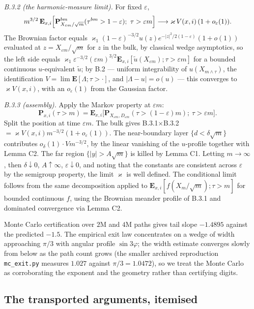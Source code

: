 \documentclass[11pt]{article}
\theoremstyle{definition}
\newcommand{\E}{\mathbf{E}}
\renewcommand{\Pr}{\mathbf{P}}
\begin{document}
\emph{B.3.2 (the harmonic-measure limit).} For fixed $\varepsilon$,
\[
  m^{3/2}\,\E_{x,i}\Bigl[\Pr^{bm}_{X_{\varepsilon m}/\sqrt m}
   (\tau^{bm}>1-\varepsilon);\ \tau>\varepsilon m\Bigr]
  \longrightarrow\varkappa\,V(x,i)\,(1+o_\varepsilon(1)).
\]
The Brownian factor equals
$\varkappa_1(1-\varepsilon)^{-3/2}u(z)e^{-|z|^{2}/2(1-\varepsilon)}(1+o(1))$
evaluated at $z=X_{\varepsilon m}/\sqrt m$ for $z$ in the bulk, by classical
wedge asymptotics, so the left side equals
$\varkappa_1\varepsilon^{-3/2}(\varepsilon m)^{3/2}
\E_{x,i}[\widetilde u(X_{\varepsilon m});\tau>\varepsilon m]$ for a bounded
continuous $u$-equivalent $\widetilde u$; by B.2 --- uniform integrability of
$u(X_{m\wedge\tau})$, the identification $V=\lim\E[\Lambda;\tau>\cdot]$, and
$|\Lambda-u|=o(u)$ --- this converges to $\varkappa V(x,i)$, with an
$o_\varepsilon(1)$ from the Gaussian factor.

\emph{B.3.3 (assembly).} Apply the Markov property at $\varepsilon m$:
\[
  \Pr_{x,i}(\tau>m)=\E_{x,i}\bigl[\Pr_{X_{\varepsilon m},D_{\varepsilon m}}
   (\tau>(1-\varepsilon)m);\ \tau>\varepsilon m\bigr].
\]
Split the position at time $\varepsilon m$. The bulk gives
B.3.1$\times$B.3.2 $=\varkappa V(x,i)m^{-3/2}(1+o_\varepsilon(1))$. The
near-boundary layer $\{d<\delta\sqrt m\}$ contributes
$o_\delta(1)\cdot Vm^{-3/2}$, by the linear vanishing of the $u$-profile
together with Lemma C2. The far region $\{|y|>A\sqrt m\}$ is killed by
Lemma C1. Letting $m\to\infty$, then $\delta\downarrow0$, $A\uparrow\infty$,
$\varepsilon\downarrow0$, and noting that the constants are consistent across
$\varepsilon$ by the semigroup property, the limit $\varkappa$ is well defined.
The conditional limit follows from the same decomposition applied to
$\E_{x,i}[f(X_m/\sqrt m);\tau>m]$ for bounded continuous $f$, using the
Brownian meander profile of B.3.1 and dominated convergence via Lemma C2.

Monte Carlo certification over $2$M and $4$M paths gives tail slope $-1.4895$
against the predicted $-1.5$. The empirical exit law concentrates on a wedge
of width approaching $\pi/3$ with angular profile $\sin3\varphi$; the width
estimate converges slowly from below as the path count grows (the smaller
archived reproduction \texttt{mc\_exit.py} measures $1.027$ against
$\pi/3=1.0472$), so we treat the Monte Carlo as corroborating the exponent
and the geometry rather than certifying digits.

\subsection{The transported arguments, itemised}\label{sec:replay}
\end{document}
